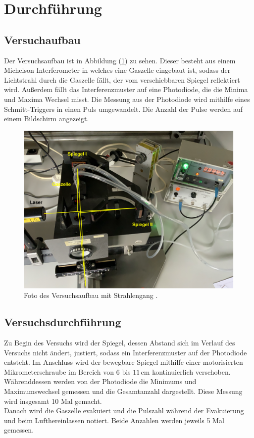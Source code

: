 \section{Durchführung}
\label{sec:Durchführung}
\subsection{Versuchaufbau}
Der Versuchsaufbau ist in Abbildung (\ref{fig:Foto}) zu sehen. Dieser besteht aus einem Michelson Interferometer in welches eine Gaszelle eingebaut ist, sodass 
der Lichtstrahl durch die Gaszelle fällt, der vom verschiebbaren Spiegel reflektiert wird. Außerdem fällt das Interferenzmuster auf eine Photodiode, die die 
Minima und Maxima Wechsel misst. Die Messung aus der Photodiode wird mithilfe eines Schmitt-Triggers in einen Puls umgewandelt. Die Anzahl der Pulse werden 
auf einem Bildschirm angezeigt. 
\begin{figure}[H]
    \centering
    \includegraphics[width=0.6\linewidth]{"content/Bilder/V401_Aufbau.jpeg"}
    \caption{Foto des Versuchsaufbau mit Strahlengang \cite{anleitungV401}.}
    \label{fig:Foto}
\end{figure}
\subsection{Versuchsdurchführung}
Zu Begin des Versuchs wird der Spiegel, dessen Abstand sich im Verlauf des Versuchs nicht ändert, justiert, sodass ein Interferenzmuster auf der 
Photodiode entsteht. Im Anschluss wird der bewegbare Spiegel mithilfe einer motorisierten Mikrometerschraube im Bereich von $6$ bis $11 \, \unit{\centi\meter}$ 
kontinuierlich verschoben. Währenddessen werden von der Photodiode die Minimums und Maximumswechsel gemessen und die Gesamtanzahl dargestellt. Diese Messung 
wird insgesamt 10 Mal gemacht. \\
Danach wird die Gaszelle evakuiert und die Pulszahl während der Evakuierung und beim Lufthereinlassen notiert. Beide Anzahlen werden jeweils 5 Mal gemessen. 
